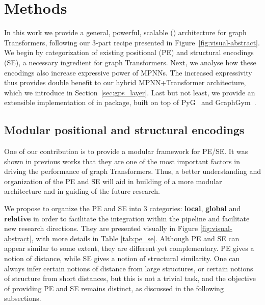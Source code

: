 \documentclass{article}
\begin{document}
\section{Methods}
\vspace{-3pt}
In this work we provide a general, powerful, scalable (\method) architecture for graph Transformers, following our 3-part recipe presented in Figure~\ref{fig:visual-abstract}. We begin by categorization of existing positional (PE) and structural encodings (SE), a necessary ingredient for graph Transformers. Next, we analyse how these encodings also increase expressive power of MPNNs. The increased expressivity thus provides double benefit to our hybrid MPNN+Transformer architecture, which we introduce in Section~\ref{sec:gps_layer}. Last but not least, we provide an extensible implementation of \method in \gtgym package, built on top of PyG~\cite{FeyLenssen2019PyG} and GraphGym~\cite{you2020design}.


\vspace{-3pt}
\subsection{Modular positional and structural encodings}
\vspace{-3pt}
\label{sec:pe_se}
One of our contribution is to provide a modular framework for PE/SE. It was shown in previous works that they are one of the most important factors in driving the performance of graph Transformers. Thus, a better understanding and organization of the PE and SE will aid in building of a more modular architecture and in guiding of the future research.

We propose to organize the PE and SE into 3 categories: \textbf{local}, \textbf{global} and \textbf{relative} in order to facilitate the integration within the pipeline and facilitate new research directions. They are presented visually in Figure \ref{fig:visual-abstract}, with more details in Table \ref{tab:pe_se}. Although PE and SE can appear similar to some extent, they are different yet complementary. PE gives a notion of distance, while SE gives a notion of structural similarity. One can always infer certain notions of distance from large structures, or certain notions of structure from short distances, but this is not a trivial task, and the objective of providing PE and SE remains distinct, as discussed in the following subsections.
\end{document}

